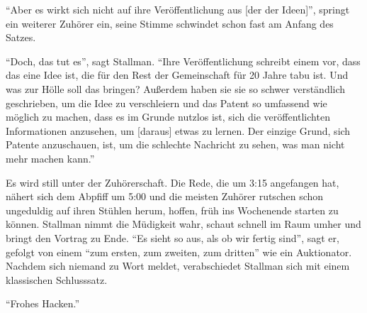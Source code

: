 "`Aber es wirkt sich nicht auf ihre Veröffentlichung aus [der der Ideen]"', springt ein weiterer Zuhörer ein, seine Stimme schwindet schon fast am Anfang des Satzes.

"`Doch, das tut es"', sagt Stallman. "`Ihre Veröffentlichung schreibt einem vor, dass das eine Idee ist, die für den Rest der Gemeinschaft für 20 Jahre tabu ist. Und was zur Hölle soll das bringen? Außerdem haben sie sie so schwer verständlich geschrieben, um die Idee zu verschleiern und das Patent so umfassend wie möglich zu machen, dass es im Grunde nutzlos ist, sich die veröffentlichten Informationen anzusehen, um [daraus] etwas zu lernen. Der einzige Grund, sich Patente anzuschauen, ist, um die schlechte Nachricht zu sehen, was man nicht mehr machen kann."'

Es wird still unter der Zuhörerschaft. Die Rede, die um 3:15 angefangen hat, nähert sich dem Abpfiff um 5:00 und die meisten Zuhörer rutschen schon ungeduldig auf ihren Stühlen herum, hoffen, früh ins Wochenende starten zu können. Stallman nimmt die Müdigkeit wahr, schaut schnell im Raum umher und bringt den Vortrag zu Ende. "`Es sieht so aus, als ob wir fertig sind"', sagt er, gefolgt von einem "`zum ersten, zum zweiten, zum dritten"' wie ein Auktionator. Nachdem sich niemand zu Wort meldet, verabschiedet Stallman sich mit einem klassischen Schlusssatz.

"`Frohes Hacken."'
